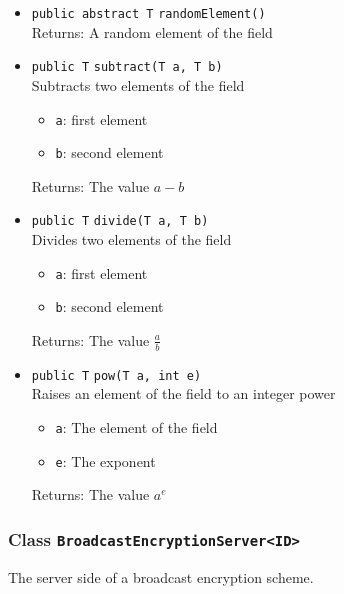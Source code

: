 \begin{itemize}
\item \lstinline|public abstract T| \lstinline|randomElement|\lstinline|()|\\
Returns: A random element of the field



\item \lstinline|public T| \lstinline|subtract|\lstinline|(T a, T b)|\\
Subtracts two elements of the field
\begin{itemize}
\item \lstinline|a|: first element
\item \lstinline|b|: second element
\end{itemize}

Returns: The value $a - b$

\item \lstinline|public T| \lstinline|divide|\lstinline|(T a, T b)|\\
Divides two elements of the field
\begin{itemize}
\item \lstinline|a|: first element
\item \lstinline|b|: second element
\end{itemize}

Returns: The value $\frac{a}{b}$

\item \lstinline|public T| \lstinline|pow|\lstinline|(T a, int e)|\\
Raises an element of the field to an integer power
\begin{itemize}
\item \lstinline|a|: The element of the field
\item \lstinline|e|: The exponent
\end{itemize}

Returns: The value $a^e$

\end{itemize}

\subsubsection{Class \lstinline|BroadcastEncryptionServer<ID>|}
The server side of a broadcast encryption scheme. \\



